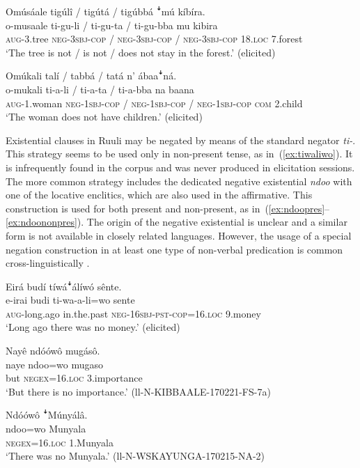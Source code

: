 \documentclass[output=paper,colorlinks,citecolor=brown,draftmode]{langscibook}
\begin{document}
\ea \label{ex:loclineg}\label{ex:ruulietal:20}
	\glll   Omúsáale tigúlî / tigútá / tigúbbá ꜜmú kíbíra.\\  
	        o-musaale ti-gu-li / ti-gu-ta / ti-gu-bba mu kibira\\
		    \textsc{aug}-3.tree \textsc{neg}-\textsc{3sbj}-\textsc{cop} / \textsc{neg}-\textsc{3sbj}-\textsc{cop} / \textsc{neg}-\textsc{3sbj}-\textsc{cop} 18.\textsc{loc} 7.forest\\
	\glt ‘The tree is not / is not / does not stay in the forest.’ 	 (elicited)
\z

\ea 
\label{ex:posslineg}\label{ex:ruulietal:21}
	\glll   Omúkali  talí / tabbá / tatá n’ ábaaꜜná.\\
	        o-mukali ti-a-li / ti-a-ta / ti-a-bba na baana\\
    		\textsc{aug}-1.woman \textsc{neg}-\textsc{1sbj}-\textsc{cop} / \textsc{neg}-\textsc{1sbj}-\textsc{cop} / \textsc{neg}-\textsc{1sbj}-\textsc{cop} \textsc{com} 2.child\\
    \glt ‘The woman does not have children.’  (elicited)
\z

Existential clauses in Ruuli may be negated by means of the standard negator \textit{ti-}. 
This strategy seems to be used only in non-present tense, as in~(\ref{ex:tiwaliwo}). 
It is infrequently found in the corpus and was never produced in elicitation sessions. 
The more common strategy includes the dedicated negative existential \textit{ndoo} with one of the locative enclitics, which are also used in the affirmative. 
This construction is used for both present and non-present, as in~(\ref{ex:ndoopres}--\ref{ex:ndoononpres}). 
The origin of the negative existential is unclear and a similar form is not available in closely related languages. 
However, the usage of a special negation construction in at least one type of non-verbal predication is common cross-linguistically \citep{Veselinova2013neg.exist, Miestamo2017}. 

\ea \label{ex:existentialneg}\label{ex:ruulietal:22}
\begin{xlist}
	\ex \label{ex:tiwaliwo}
	\glll   Eirá budí tíwáꜜálíwó sênte.\\
	        e-irai budi ti-wa-a-li=wo sente\\
		\textsc{aug}-long.ago in.the.past  \textsc{neg}-16\textsc{sbj}-\textsc{pst}-\textsc{cop}=16.\textsc{loc} 9.money\\
	\glt ‘Long ago there was no money.’ (elicited)
	
\ex \label{ex:ndoopres}\label{ex:ruulietal:22b}
	\glll   Nayê ndóówô mugásô.\\
	        naye ndoo=wo mugaso\\ 
		    but \textsc{negex}=16.\textsc{loc} 3.importance\\
	\glt ‘But there is no importance.’ (ll-N-KIBBAALE-170221-FS-7a)

\ex \label{ex:ndoononpres}\label{ex:ruulietal:22c}
	\glll   Ndóówô ꜜMúnyálâ.\\
	        ndoo=wo Munyala\\
		    \textsc{negex=16.loc} 1.Munyala\\
	\glt ‘There was no Munyala.’ (ll-N-WSKAYUNGA-170215-NA-2)
\end{xlist}
\z
\end{document}
